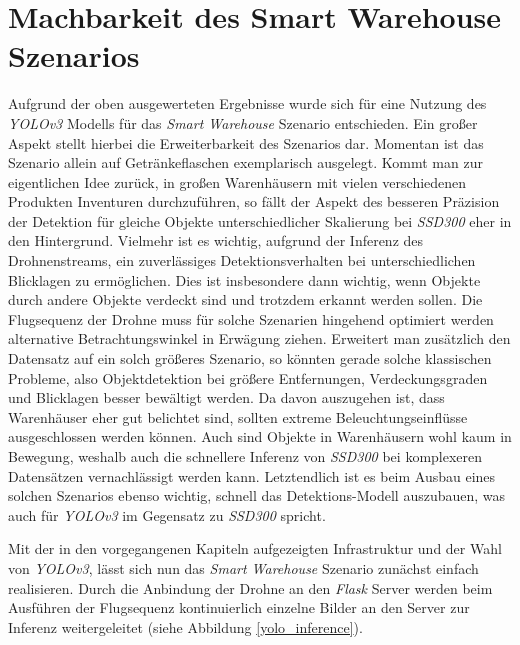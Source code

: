\section{Machbarkeit des Smart Warehouse Szenarios}

Aufgrund der oben ausgewerteten Ergebnisse wurde sich für eine Nutzung des \textit{YOLOv3} Modells für das \textit{Smart Warehouse} Szenario entschieden. Ein großer Aspekt stellt hierbei die Erweiterbarkeit des Szenarios dar. Momentan ist das Szenario allein auf Getränkeflaschen exemplarisch ausgelegt. Kommt man zur eigentlichen Idee zurück, in großen Warenhäusern mit vielen verschiedenen Produkten Inventuren durchzuführen, so fällt der Aspekt des besseren Präzision der Detektion für gleiche Objekte unterschiedlicher Skalierung bei \textit{SSD300} eher in den Hintergrund. Vielmehr ist es wichtig, aufgrund der Inferenz des Drohnenstreams, ein zuverlässiges Detektionsverhalten bei unterschiedlichen Blicklagen zu ermöglichen. Dies ist insbesondere dann wichtig, wenn Objekte durch andere Objekte verdeckt sind und trotzdem erkannt werden sollen. Die Flugsequenz der Drohne muss für solche Szenarien hingehend optimiert werden alternative Betrachtungswinkel in Erwägung ziehen. Erweitert man zusätzlich den Datensatz auf ein solch größeres Szenario, so könnten gerade solche klassischen Probleme, also Objektdetektion bei größere Entfernungen, Verdeckungsgraden und Blicklagen besser bewältigt werden. Da davon auszugehen ist, dass Warenhäuser eher gut belichtet sind, sollten extreme Beleuchtungseinflüsse ausgeschlossen werden können. Auch sind Objekte in Warenhäusern wohl kaum in Bewegung, weshalb auch die schnellere Inferenz von \textit{SSD300} bei komplexeren Datensätzen vernachlässigt werden kann. Letztendlich ist es beim Ausbau eines solchen Szenarios ebenso wichtig, schnell das Detektions-Modell auszubauen, was auch für \textit{YOLOv3} im Gegensatz zu \textit{SSD300} spricht. 

Mit der in den vorgegangenen Kapiteln aufgezeigten Infrastruktur und der Wahl von \textit{YOLOv3}, lässt sich nun das \textit{Smart Warehouse} Szenario zunächst einfach realisieren. Durch die Anbindung der Drohne an den \textit{Flask} Server werden beim Ausführen der Flugsequenz kontinuierlich einzelne Bilder an den Server zur Inferenz weitergeleitet (siehe Abbildung \ref{yolo_inference}). 

